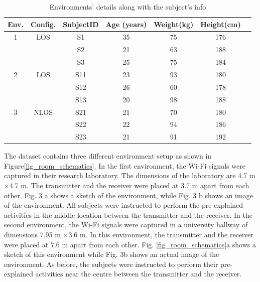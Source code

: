 \documentclass[conference]{IEEEtran}
\begin{document}
\begin{table}
    \begin{tabular}{|| c | c | c | c | c | c | c||} 
     \hline
     Env. & Config. & Subject\newline ID & Age \newline (years) & Weight\newline (kg) & Height\newline (cm)\\ [0.2ex]
     \hline\hline
     1	& LOS	& S1	& 35    & 75	& 176\\ [1ex] 
        &       & S2	& 21    & 63	& 188\\ [1ex] 
        &       & S3	& 25    & 75	& 184\\ [1ex] 
     \hline
    2	& LOS	& S11	& 23	& 93	& 180\\ [1ex] 
        &       & S12	& 26	& 60	& 178\\ [1ex] 
        &       & S13	& 20	& 98	& 188\\ [1ex] 
     \hline
    3	& NLOS  & S21	& 21	& 70	& 180\\ [1ex] 
        &       & S22	& 22	& 94	& 186\\ [1ex] 
        &       & S23	& 21	& 91	& 192\\ [1ex] 
     \hline\hline
    \end{tabular}
\caption{\label{tabtable_subjects}Environments' details along with the subject's info}
\end{table}
  
The dataset \cite{dataset} contains three different environment setup as shown in Figure\ref{fig_room_schematics}. In the first environment, the Wi-Fi signals were captured in their research laboratory. The dimensions of the laboratory are 4.7 m ×4.7 m. The transmitter and the receiver were placed at 3.7 m apart from each other. Fig. 3 a shows a sketch of the environment, while Fig. 3 b shows an image of the environment. All subjects were instructed to perform the pre-explained activities in the middle location between the transmitter and the receiver. In the second environment, the Wi-Fi signals were captured in a university hallway of dimensions 7.95 m ×3.6 m. In this environment, the transmitter and the receiver were placed at 7.6 m apart from each other. Fig. \ref{fig_room_schematics}a shows a sketch of this environment while Fig. 3b shows an actual image of the environment. As before, the subjects were instructed to perform their pre-explained activities near the centre between the transmitter and the receiver.
\end{document}
